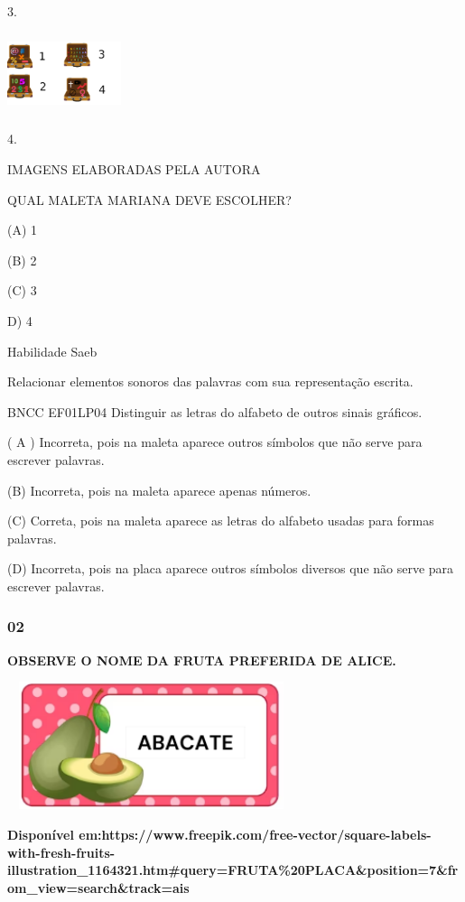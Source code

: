 3.

\includegraphics[width=1.31218in,height=0.92930in]{media/image209.png}

4.

IMAGENS ELABORADAS PELA AUTORA

QUAL MALETA MARIANA DEVE ESCOLHER?

(A) 1

(B) 2

(C) 3

D) 4

Habilidade Saeb

Relacionar elementos sonoros das palavras com sua representação escrita.

BNCC EF01LP04 Distinguir as letras do alfabeto de outros sinais
gráficos.

( A ) Incorreta, pois na maleta aparece outros símbolos que não serve
para escrever palavras.

(B) Incorreta, pois na maleta aparece apenas números.

(C) Correta, pois na maleta aparece as letras do alfabeto usadas para
formas palavras.

(D) Incorreta, pois na placa aparece outros símbolos diversos que não
serve para escrever palavras.

\subsubsection{02}\label{section-42}

\textbf{OBSERVE O NOME DA FRUTA PREFERIDA DE ALICE.}

\includegraphics[width=3.32292in,height=1.46928in]{media/image212.png}

\textbf{Disponível
em:https://www.freepik.com/free-vector/square-labels-with-fresh-fruits-illustration\_1164321.htm\#query=FRUTA\%20PLACA\&position=7\&from\_view=search\&track=ais}

